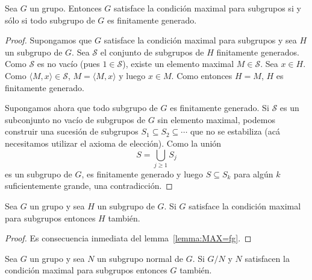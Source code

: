 
\begin{lemma}
	\label{lemma:MAX=fg}
	Sea $G$ un grupo. Entonces $G$ satisface la condición maximal para
	subgrupos si y sólo si todo subgrupo de $G$ es finitamente generado.
\end{lemma}

\begin{proof}
	Supongamos que $G$ satisface la condición maximal para subgrupos y sea $H$
	un subgrupo de $G$.  Sea $\mathcal{S}$ el conjunto de subgrupos de $H$
	finitamente generados. Como $\mathcal{S}$ es no vacío (pues
	$1\in\mathcal{S}$), existe un elemento maximal $M\in\mathcal{S}$.  Sea
	$x\in H$. Como $\langle M,x\rangle\in\mathcal{S}$, $M=\langle M,x\rangle$ y
	luego $x\in M$. Como entonces $H=M$, $H$ es finitamente generado.

	Supongamos ahora que todo subgrupo de $G$ es finitamente generado. Si
	$\mathcal{S}$ es un subconjunto no vacío de subgrupos de $G$ sin elemento
	maximal, podemos construir una sucesión de subgrupos $S_1\subseteq
	S_2\subseteq\cdots$ que no se estabiliza (acá necesitamos utilizar el
	axioma de elección). Como la unión 
	\[
		S=\bigcup_{j\geq1}S_j 
	\]
	es un subgrupo de $G$, es finitamente generado y luego $S\subseteq S_k$
	para algún $k$ suficientemente grande, una contradicción.
\end{proof}

\begin{proposition}
	\label{proposition:max:N}
	Sea $G$ un grupo y sea $H$ un subgrupo de $G$.  Si $G$ satisface la
	condición maximal para subgrupos entonces $H$ también. 
\end{proposition}

\begin{proof}
	Es consecuencia inmediata del lemma~\ref{lemma:MAX=fg}.
\end{proof}

\begin{proposition}
	\label{proposition:max:G/N}
	Sea $G$ un grupo y sea $N$ un subgrupo normal de $G$.  Si $G/N$ y $N$
	satisfacen la condición maximal para subgrupos entonces $G$ también. 
\end{proposition}

